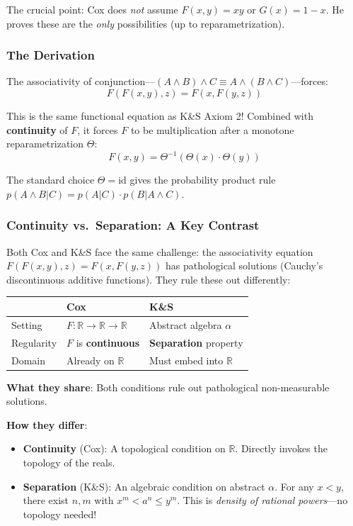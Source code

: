 \documentclass[11pt]{article}
\theoremstyle{definition}
\theoremstyle{remark}
\begin{document}
The crucial point: Cox does \emph{not} assume $F(x,y) = xy$ or $G(x) = 1-x$.
He proves these are the \emph{only} possibilities (up to reparametrization).

\subsubsection{The Derivation}

The associativity of conjunction---$(A \land B) \land C \equiv A \land (B \land C)$---forces:
\[F(F(x,y), z) = F(x, F(y,z))\]

This is the same functional equation as K\&S Axiom 2!
Combined with \textbf{continuity} of $F$, it forces $F$ to be multiplication after a monotone reparametrization $\Theta$:
\[F(x,y) = \Theta^{-1}(\Theta(x) \cdot \Theta(y))\]

The standard choice $\Theta = \text{id}$ gives the probability product rule $p(A \land B | C) = p(A|C) \cdot p(B|A \land C)$.

\subsubsection{Continuity vs.\ Separation: A Key Contrast}

Both Cox and K\&S face the same challenge: the associativity equation $F(F(x,y),z) = F(x,F(y,z))$ has pathological solutions (Cauchy's discontinuous additive functions).
They rule these out differently:

\begin{center}
\begin{tabular}{lll}
& \textbf{Cox} & \textbf{K\&S} \\
\hline
Setting & $F : \mathbb{R} \to \mathbb{R} \to \mathbb{R}$ & Abstract algebra $\alpha$ \\
Regularity & $F$ is \textbf{continuous} & \textbf{Separation} property \\
Domain & Already on $\mathbb{R}$ & Must embed into $\mathbb{R}$ \\
\end{tabular}
\end{center}

\textbf{What they share}: Both conditions rule out pathological non-measurable solutions.

\textbf{How they differ}:
\begin{itemize}
\item \textbf{Continuity} (Cox): A topological condition on $\mathbb{R}$.
  Directly invokes the topology of the reals.

\item \textbf{Separation} (K\&S): An algebraic condition on abstract $\alpha$.
  For any $x < y$, there exist $n, m$ with $x^m < a^n \leq y^m$.
  This is \emph{density of rational powers}---no topology needed!
\end{itemize}
\end{document}

